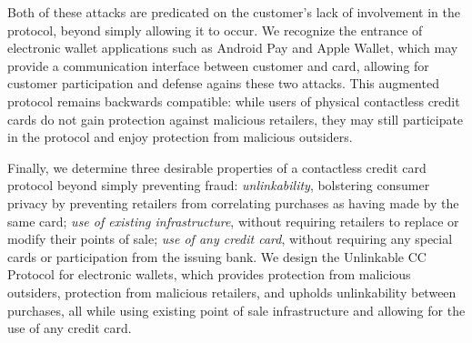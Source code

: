 Both of these attacks are predicated on the customer's lack of involvement in the protocol, beyond simply allowing it to occur.
We recognize the entrance of electronic wallet applications such as Android Pay and Apple Wallet, which may provide a communication interface between customer and card,
  allowing for customer participation and defense agains these two attacks.
This augmented protocol remains backwards compatible: while users of physical contactless credit cards do not gain protection against malicious retailers,
    they may still participate in the protocol and enjoy protection from malicious outsiders.

Finally, we determine three desirable properties of a contactless credit card protocol beyond simply preventing fraud:
    \emph{unlinkability}, bolstering consumer privacy by preventing retailers from correlating purchases as having made by the same card;
    \emph{use of existing infrastructure}, without requiring retailers to replace or modify their points of sale;
    \emph{use of any credit card}, without requiring any special cards or participation from the issuing bank.
We design the Unlinkable CC Protocol for electronic wallets, which provides
    protection from malicious outsiders,
    protection from malicious retailers,
    and upholds unlinkability between purchases,
    all while using existing point of sale infrastructure and allowing for the use of any credit card.
